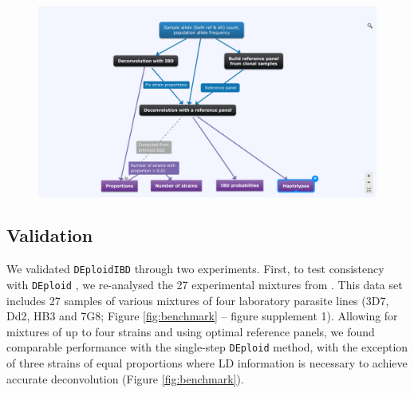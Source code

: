 \documentclass[9pt,lineno]{elife}
\begin{document}
\begin{figure}[ht]
{   }{\includegraphics[width=.8\textwidth]{scheme.pdf}}
\end{figure}


\subsection{Validation}

We validated \texttt{DEploidIBD} through two experiments.  First, to test consistency with \texttt{DEploid} \citet{Zhu2017}, we re-analysed the 27 experimental mixtures from \citep{Wendler2015}.  This data set includes 27 samples of various mixtures of four laboratory parasite lines (3D7, Dd2, HB3 and 7G8; Figure \ref{fig:benchmark} – figure supplement 1).  Allowing for mixtures of up to four strains and using optimal reference panels, we found comparable performance with the single-step \texttt{DEploid} method, with the exception of three strains of equal proportions where LD information is necessary to achieve accurate deconvolution (Figure \ref{fig:benchmark}).
\end{document}
